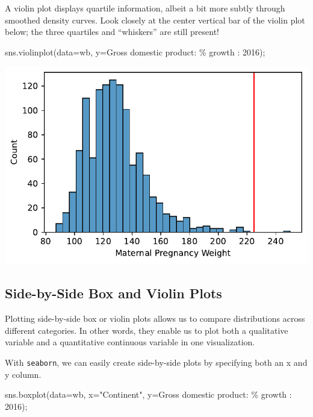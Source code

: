 \documentclass[
  letterpaper,
  DIV=11,
  numbers=noendperiod]{scrreprt}
\newenvironment{Shaded}{\begin{snugshade}}{\end{snugshade}}
\newcommand{\NormalTok}[1]{\textcolor[rgb]{0.00,0.23,0.31}{#1}}
\newcommand{\OperatorTok}[1]{\textcolor[rgb]{0.37,0.37,0.37}{#1}}
\newcommand{\SpecialCharTok}[1]{\textcolor[rgb]{0.37,0.37,0.37}{#1}}
\newcommand{\StringTok}[1]{\textcolor[rgb]{0.13,0.47,0.30}{#1}}
\begin{document}
A violin plot displays quartile information, albeit a bit more subtly
through smoothed density curves. Look closely at the center vertical bar
of the violin plot below; the three quartiles and ``whiskers'' are still
present!

\begin{Shaded}
\begin{Highlighting}[]
\NormalTok{sns.violinplot(data}\OperatorTok{=}\NormalTok{wb, y}\OperatorTok{=}\StringTok{\textquotesingle{}Gross domestic product: }\SpecialCharTok{\% g}\StringTok{rowth : 2016\textquotesingle{}}\NormalTok{)}\OperatorTok{;}
\end{Highlighting}
\end{Shaded}

\includegraphics{visualization_1/visualization_1_files/figure-pdf/cell-12-output-1.pdf}

\subsection{Side-by-Side Box and Violin
Plots}\label{side-by-side-box-and-violin-plots}

Plotting side-by-side box or violin plots allows us to compare
distributions across different categories. In other words, they enable
us to plot both a qualitative variable and a quantitative continuous
variable in one visualization.

With \texttt{seaborn}, we can easily create side-by-side plots by
specifying both an x and y column.

\begin{Shaded}
\begin{Highlighting}[]
\NormalTok{sns.boxplot(data}\OperatorTok{=}\NormalTok{wb, x}\OperatorTok{=}\StringTok{"Continent"}\NormalTok{, y}\OperatorTok{=}\StringTok{\textquotesingle{}Gross domestic product: }\SpecialCharTok{\% g}\StringTok{rowth : 2016\textquotesingle{}}\NormalTok{)}\OperatorTok{;}
\end{Highlighting}
\end{Shaded}
\end{document}
